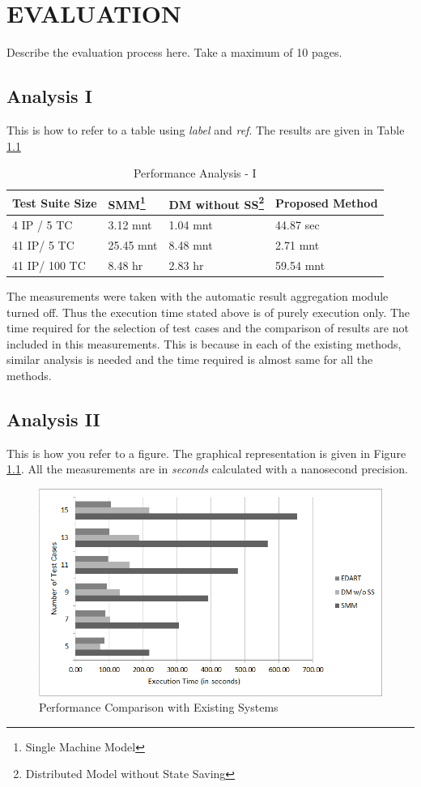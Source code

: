 \chapter{EVALUATION}
\par Describe the evaluation process here. Take a maximum of 10 pages.
\section{Analysis I}
\par This is how to refer to a table using \emph{label} and \emph{ref}. The results are given in Table \ref{tab:largescale}

\begin{table}[ht]
    \centering
    \begin{tabular}{|p{2.5cm}|p{3cm}|p{3cm}|p{3cm}|}
        \hline
        Test Suite Size & SMM\footnote{Single Machine Model} & DM without SS\footnote{Distributed Model without State Saving} & Proposed Method \\
        \hline
        4 IP / 5 TC & 3.12 mnt & 1.04 mnt & 44.87 sec \\
        \hline
        41 IP/ 5 TC & 25.45 mnt & 8.48 mnt & 2.71 mnt \\
        \hline
        41 IP/ 100 TC & 8.48 hr & 2.83 hr & 59.54 mnt \\
        \hline
    \end{tabular}
    \caption{Performance Analysis - I}
    \label{tab:largescale}
\end{table}

\par The measurements were taken with the automatic result aggregation module turned off. Thus the execution time stated above is of purely execution only. The time required for the selection of test cases and the comparison of results are not included in this measurements. This is because in each of the existing methods, similar analysis is needed and the time required is almost same for all the methods.
\vfill

\section{Analysis II}
\par This is how you refer to a figure. The graphical representation is given in Figure \ref{fig:graph}. All the measurements are in \emph{seconds} calculated with a nanosecond precision.

\begin{figure}[h]
    \centering
    \includegraphics[width=\textwidth]{images/graph.png}
    \caption{Performance Comparison with Existing Systems}
    \label{fig:graph}
\end{figure}
\vfill

\newpage
